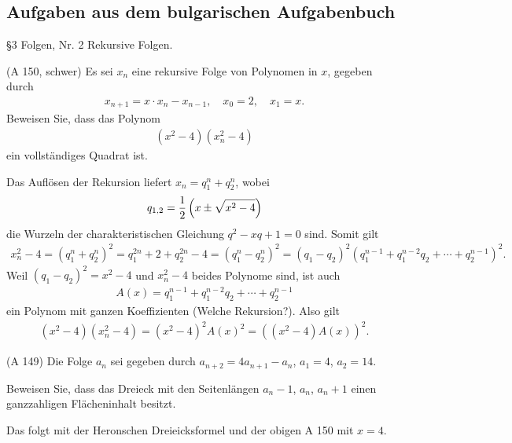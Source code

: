 \documentclass[11pt,a4paper]{article}
\begin{document}
\subsection*{Aufgaben aus dem bulgarischen Aufgabenbuch}
 \S 3 Folgen, Nr. 2 Rekursive Folgen.

\begin{aufgabe}(A 150, schwer)
Es sei $x_n$ eine rekursive Folge von Polynomen in $x$, gegeben durch
\begin{gather*}
x_{n+1} = x\cdot x_n -x_{n-1}, \quad x_0=2,\quad x_1= x.
\end{gather*}
Beweisen Sie, dass das Polynom
\begin{gather*}
(x^2-4) (x_n^2 -4)
\end{gather*}
ein vollständiges Quadrat ist.
\end{aufgabe}

\begin{beweis} 
Das Auflösen der Rekursion liefert $x_n=q_1^n +q_2^n$, wobei
\begin{gather*}
q_{1,2}=\frac{1}{2}\left(x \pm \sqrt{x^2 -4}\right)
\end{gather*}
die Wurzeln der charakteristischen Gleichung $q^2 -xq +1 =0$ sind. Somit gilt
\begin{gather*}
x_n^2-4 =(q_1^n +q_2^n)^2 =q_1^{2n} +2 +q_2^{2n } -4 =(q_1^n -q_2^n)^2
=(q_1 -q_2)^2(q_1^{n-1} +q_1^{n-2}q_2 +\cdots +q_2^{n-1})^2.
\end{gather*}
Weil $(q_1 -q_2)^2 = x^2 -4$  und $x_n^2 -4$ beides Polynome sind, ist auch
\begin{gather*}
A(x)= q_1^{n-1} +q_1^{n-2}q_2 +\cdots +q_2^{n-1}
\end{gather*} 
ein Polynom mit ganzen Koeffizienten (Welche Rekursion?). Also gilt
\begin{gather*}
(x^2-4)(x_n^2 -4)=(x^2-4)^2 A(x)^2=((x^2-4) A(x))^2.
\end{gather*}
\end{beweis}

\begin{aufgabe} (A 149) Die Folge $a_n$ sei gegeben durch $a_{n+2}=4a_{n+1}
  -a_n$, $ a_1= 4$, $a_2=14$.

Beweisen Sie, dass das Dreieck mit den Seitenlängen $a_n-1$, $a_n$, $a_{n} +1$
einen ganzzahligen Flächeninhalt besitzt.
\end{aufgabe}
\begin{beweis} 
Das folgt mit der {\sc Heron}schen Dreieicksformel und der obigen A 150 mit
$x=4$.
\end{beweis}
\end{document}
